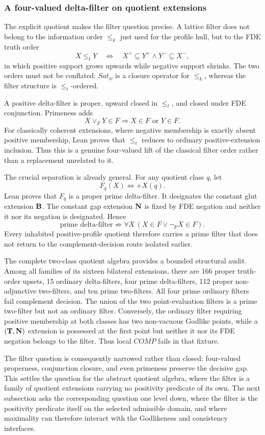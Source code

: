 \subsubsection{A four-valued delta-filter on quotient extensions}
\label{sec:quotient-delta-filter}

The explicit quotient makes the filter question precise. A lattice filter does not belong to the information order \(\leq_k\) just used for the profile hull, but to the FDE truth order
\[
  X\leq_tY
  \quad\Longleftrightarrow\quad
  X^{+}\subseteq Y^{+}\land Y^{-}\subseteq X^{-},
\]
in which positive support grows upwards while negative support shrinks. The two orders must not be conflated: \(Sat_w\) is a closure operator for \(\leq_k\), whereas the filter structure is \(\leq_t\)-ordered.

A positive delta-filter is proper, upward closed in \(\leq_t\), and closed under FDE conjunction. Primeness adds
\[
  X\vee_FY\in F\Longrightarrow X\in F\text{ or }Y\in F.
\]
For classically coherent extensions, where negative membership is exactly absent positive membership, Lean proves that \(\leq_t\) reduces to ordinary positive-extension inclusion. Thus this is a genuine four-valued lift of the classical filter order rather than a replacement unrelated to it.

The crucial separation is already general. For any quotient class \(q\), let
\[
  F_q(X)\Longleftrightarrow +X(q).
\]
Lean proves that \(F_q\) is a proper prime delta-filter. It designates the constant glut extension \(\mathbf{B}\). The constant gap extension \(\mathbf{N}\) is fixed by FDE negation and neither it nor its negation is designated. Hence
\[
\boxed{
  \text{prime delta-filter}
  \not\Longrightarrow
  \forall X\,(X\in F\lor\neg_FX\in F).
}
\]
Every inhabited positive-profile quotient therefore carries a prime filter that does not return to the complement-decision route isolated earlier.

The complete two-class quotient algebra provides a bounded structural audit. Among all families of its sixteen bilateral extensions, there are 166 proper truth-order upsets, 15 ordinary delta-filters, four prime delta-filters, 112 proper non-adjunctive two-filters, and ten prime two-filters. All four prime ordinary filters fail complement decision. The union of the two point-evaluation filters is a prime two-filter but not an ordinary filter. Conversely, the ordinary filter requiring positive membership at both classes has two non-vacuous Godlike points, while a \((\mathbf{T},\mathbf{N})\) extension is possessed at the first point but neither it nor its FDE negation belongs to the filter. Thus local \(COMP\) fails in that fixture.

The filter question is consequently narrowed rather than closed: four-valued properness, conjunction closure, and even primeness preserve the decisive gap. This settles the question for the abstract quotient algebra, where the filter is a family of quotient extensions carrying no positivity predicate of its own. The next subsection asks the corresponding question one level down, where the filter is the positivity predicate itself on the selected admissible domain, and where maximality can therefore interact with the Godlikeness and consistency interfaces.
